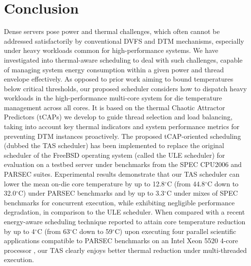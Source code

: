 \documentclass[times, 10pt,twocolumn]{IEEEtran}
\begin{document}

\section{Conclusion}
\label{sec:conclusion}
Dense servers pose power and thermal challenges, which often cannot be
addressed satisfactorily by conventional DVFS and DTM mechanisms,
especially under heavy workloads common for high-performance systems.
We have investigated into thermal-aware scheduling to deal with such
challenges, capable of managing system energy consumption within a given
power and thread envelope effectively.  As opposed to prior work aiming
to bound temperatures below critical thresholds, our proposed scheduler
considers how to dispatch heavy workloads in the high-performance
multi-core system for die temperature management across all cores.  It
is based on the thermal Chaotic Attractor Predictors (tCAPs) we develop
to guide thread selection and load balancing, taking into account key
thermal indicators and system performance metrics for preventing DTM
instances proactively.  The proposed tCAP-oriented scheduling (dubbed
the TAS scheduler) has been implemented to replace the original
scheduler of the FreeBSD operating system (called the ULE scheduler) for
evaluation on a testbed server under benchmarks from the SPEC CPU2006
and PARSEC suites.  Experimental results demonstrate that our TAS
scheduler can lower the mean on-die core temperature by up to
12.8$^{\circ}$C (from 44.8$^\circ$C down to 32.0$^\circ$C) 
under PARSEC benchmarks and by up to 3.3$^{\circ}$C under
mixes of SPEC benchmarks for concurrent execution, while exhibiting
negligible performance degradation, in comparison to the ULE scheduler.
When compared with a recent energy-aware scheduling technique reported
to attain core temperature reduction by up to 4$^\circ$C 
(from 63$^\circ$C down to 59$^\circ$C) upon executing 
four parallel scientific applications compatible to PARSEC benchmarks 
on an Intel Xeon 5520 4-core processor \cite{Sarood2011}, our TAS
clearly enjoys better thermal reduction under multi-threaded execution.

\label{sec:references}
\begin{small}


\end{small}
\end{document}

